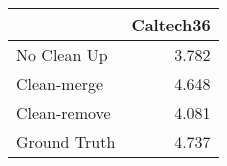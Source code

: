 \begin{tabular}{lr}
\toprule
{} & Caltech36 \\
\midrule
No Clean Up  &     3.782 \\
Clean-merge  &     4.648 \\
Clean-remove &     4.081 \\
Ground Truth &     4.737 \\
\bottomrule
\end{tabular}
